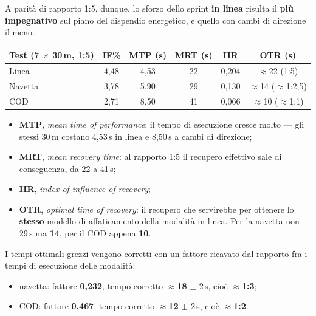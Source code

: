 A parità di rapporto 1:5, dunque, lo sforzo dello sprint \textbf{in linea} risulta il
\textbf{più impegnativo} sul piano del dispendio energetico, e quello con cambi di direzione il
meno.

\begin{table}[htbp]
  \centering
  \small
  \renewcommand{\arraystretch}{1.3}
  \begin{tabularx}{\textwidth}{|X|c|c|c|c|c|}
    \hline
    \textbf{Test} (7 $\times$ 30\,m, 1:5) & \textbf{IF\%} & \textbf{MTP} (s) &
      \textbf{MRT} (s) & \textbf{IIR} & \textbf{OTR} (s) \\
    \hline
    Linea & 4,48 & 4,53 & 22 & 0,204 & $\approx$22 (1:5) \\
    \hline
    Navetta & 3,78 & 5,90 & 29 & 0,130 & $\approx$14 ($\approx$1:2,5) \\
    \hline
    COD & 2,71 & 8,50 & 41 & 0,066 & $\approx$10 ($\approx$1:1) \\
    \hline
  \end{tabularx}
\end{table}

\begin{itemize}
  \item \textbf{MTP}, \textit{mean time of performance}: il tempo di esecuzione cresce molto ---
    gli stessi 30\,m costano 4,53\,s in linea e 8,50\,s a cambi di direzione;
  \item \textbf{MRT}, \textit{mean recovery time}: al rapporto 1:5 il recupero effettivo sale di
    conseguenza, da 22 a 41\,s;
  \item \textbf{IIR}, \textit{index of influence of recovery};
  \item \textbf{OTR}, \textit{optimal time of recovery}: il recupero che servirebbe per ottenere
    lo \textbf{stesso} modello di affaticamento della modalità in linea. Per la navetta non 29\,s
    ma \textbf{14}, per il COD appena \textbf{10}.
\end{itemize}

I tempi ottimali grezzi vengono corretti con un fattore ricavato dal rapporto fra i tempi di
esecuzione delle modalità:
\begin{itemize}
  \item navetta: fattore \textbf{0,232}, tempo corretto $\approx$\textbf{18} $\pm$ 2\,s,
    cioè $\approx$\textbf{1:3};
  \item COD: fattore \textbf{0,467}, tempo corretto $\approx$\textbf{12} $\pm$ 2\,s,
    cioè $\approx$\textbf{1:2}.
\end{itemize}

